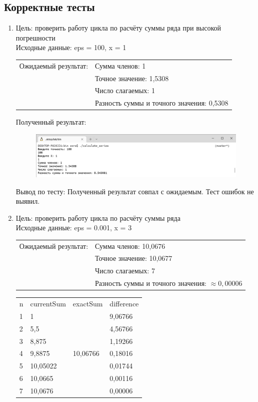 \documentclass[a4paper]{article}
\begin{document}
	\subsection{Корректные тесты}
	\begin{enumerate}[label=\textbf{Тест \arabic*}]
		\item Цель: проверить работу цикла по расчёту суммы ряда при высокой погрешности \\
		Исходные данные: eps = 100, x = 1 \\
		
		\begin{tabular}{l l}
			Ожидаемый результат: & Сумма членов: 1 \\
			& Точное значение: 1,5308 \\
			& Число слагаемых: 1 \\
			& Разность суммы и точного значения: 0,5308 \\[4mm]
		\end{tabular}
	
		Полученный результат:
		
		\begin{figure}[h]
			\includegraphics[width=\textwidth,trim=0.5mm 0 0 0.5mm,clip]{tests/test100.png}
		\end{figure}
		
		Вывод по тесту: Полученный результат совпал с ожидаемым. Тест ошибок не выявил.
		\newpage
		
		\item Цель: проверить работу цикла по расчёту суммы ряда \\
		Исходные данные: eps = 0.001, x = 3 \\
		
		\begin{tabular}{l l}
			Ожидаемый результат: & Сумма членов: 10,0676 \\
			& Точное значение: 10,0677 \\
			& Число слагаемых: 7 \\
			& Разность суммы и точного значения: $\approx 0,00006$ \\[4mm]
		\end{tabular}
		
		\begin{tabular}{l|l|l|l}
			n & currentSum & exactSum & difference  \\
			1 &  1  &\multirow{7}{*}{10,06766}& 9,06766 \\
			2 &  5,5  &       & 4,56766 \\
			3 &  8,875  &     & 1,19266 \\
			4 &  9,8875  &    & 0,18016 \\
			5 &  10,05022 &   & 0,01744 \\
			6 &  10,0665  &   & 0,00116 \\
			7 &  10,0676  &   & 0,00006 \\
		\end{tabular}
		

\end{enumerate}
\end{document}
